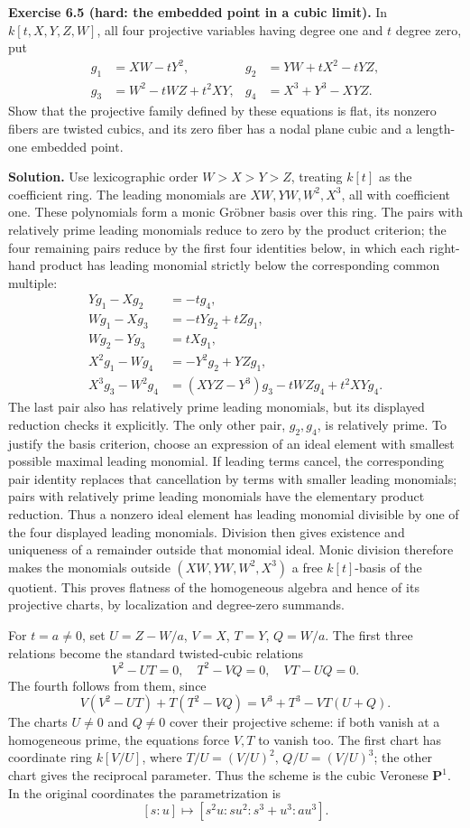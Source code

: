 \documentclass[11pt]{article}
\begin{document}
\textbf{Exercise 6.5 (hard: the embedded point in a cubic limit).} In
\(k[t,X,Y,Z,W]\), all four projective variables having degree one and
\(t\) degree zero, put \[
\begin{aligned}
g_1&=XW-tY^2,&g_2&=YW+tX^2-tYZ,\\
g_3&=W^2-tWZ+t^2XY,&g_4&=X^3+Y^3-XYZ.
\end{aligned}
\] Show that the projective family defined by these equations is flat,
its nonzero fibers are twisted cubics, and its zero fiber has a nodal
plane cubic and a length-one embedded point.

\textbf{Solution.} Use lexicographic order \(W>X>Y>Z\), treating
\(k[t]\) as the coefficient ring. The leading monomials are
\(XW,YW,W^2,X^3\), all with coefficient one. These polynomials form a
monic Gröbner basis over this ring. The pairs with relatively prime
leading monomials reduce to zero by the product criterion; the four
remaining pairs reduce by the first four identities below, in which each
right-hand product has leading monomial strictly below the corresponding
common multiple: \[
\begin{aligned}
Yg_1-Xg_2&=-t g_4,\\
Wg_1-Xg_3&=-tYg_2+tZg_1,\\
Wg_2-Yg_3&=tXg_1,\\
X^2g_1-Wg_4&=-Y^2g_2+YZg_1,\\
X^3g_3-W^2g_4&=(XYZ-Y^3)g_3-tWZg_4+t^2XYg_4.
\end{aligned}
\] The last pair also has relatively prime leading monomials, but its
displayed reduction checks it explicitly. The only other pair,
\(g_2,g_4\), is relatively prime. To justify the basis criterion, choose
an expression of an ideal element with smallest possible maximal leading
monomial. If leading terms cancel, the corresponding pair identity
replaces that cancellation by terms with smaller leading monomials;
pairs with relatively prime leading monomials have the elementary
product reduction. Thus a nonzero ideal element has leading monomial
divisible by one of the four displayed leading monomials. Division then
gives existence and uniqueness of a remainder outside that monomial
ideal. Monic division therefore makes the monomials outside
\((XW,YW,W^2,X^3)\) a free \(k[t]\)-basis of the quotient. This proves
flatness of the homogeneous algebra and hence of its projective charts,
by localization and degree-zero summands.

For \(t=a\ne0\), set \(U=Z-W/a\), \(V=X\), \(T=Y\), \(Q=W/a\). The first
three relations become the standard twisted-cubic relations \[
V^2-UT=0,\quad T^2-VQ=0,\quad VT-UQ=0.
\] The fourth follows from them, since \[
V(V^2-UT)+T(T^2-VQ)=V^3+T^3-VT(U+Q). 
\] The charts \(U\ne0\) and \(Q\ne0\) cover their projective scheme: if
both vanish at a homogeneous prime, the equations force \(V,T\) to
vanish too. The first chart has coordinate ring \(k[V/U]\), where
\(T/U=(V/U)^2\), \(Q/U=(V/U)^3\); the other chart gives the reciprocal
parameter. Thus the scheme is the cubic Veronese \(\mathbf P^1\). In the
original coordinates the parametrization is \[
[s:u]\longmapsto[s^2u:su^2:s^3+u^3:a u^3].
\]
\end{document}
